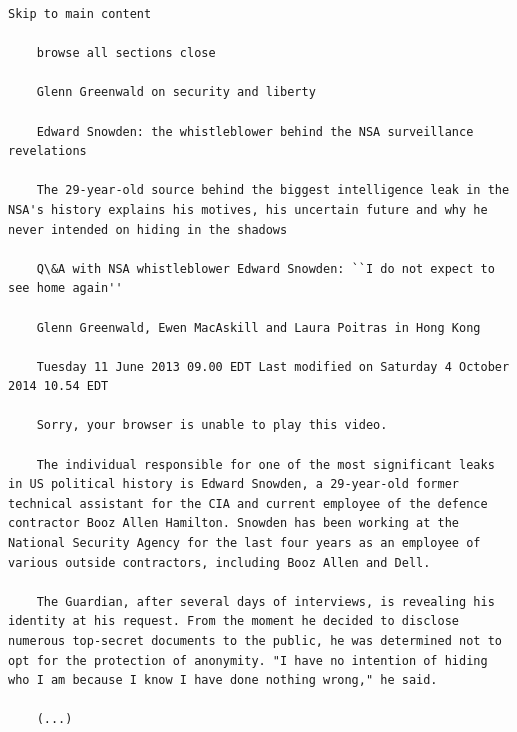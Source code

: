 \documentclass[a4paper,12pt,titlepage=false]{scrreprt}
\begin{document}
\begin{minipage}[t]{.5\textwidth}
    \vspace{.5cm}
    \scriptsize
    \begin{lstlisting}[breaklines=true]
    Skip to main content

    browse all sections close

    Glenn Greenwald on security and liberty

    Edward Snowden: the whistleblower behind the NSA surveillance revelations

    The 29-year-old source behind the biggest intelligence leak in the NSA's history explains his motives, his uncertain future and why he never intended on hiding in the shadows

    Q\&A with NSA whistleblower Edward Snowden: ``I do not expect to see home again''

    Glenn Greenwald, Ewen MacAskill and Laura Poitras in Hong Kong

    Tuesday 11 June 2013 09.00 EDT Last modified on Saturday 4 October 2014 10.54 EDT

    Sorry, your browser is unable to play this video.

    The individual responsible for one of the most significant leaks in US political history is Edward Snowden, a 29-year-old former technical assistant for the CIA and current employee of the defence contractor Booz Allen Hamilton. Snowden has been working at the National Security Agency for the last four years as an employee of various outside contractors, including Booz Allen and Dell.

    The Guardian, after several days of interviews, is revealing his identity at his request. From the moment he decided to disclose numerous top-secret documents to the public, he was determined not to opt for the protection of anonymity. "I have no intention of hiding who I am because I know I have done nothing wrong," he said.

    (...)
    \end{lstlisting}
\end{minipage}%
\end{document}

